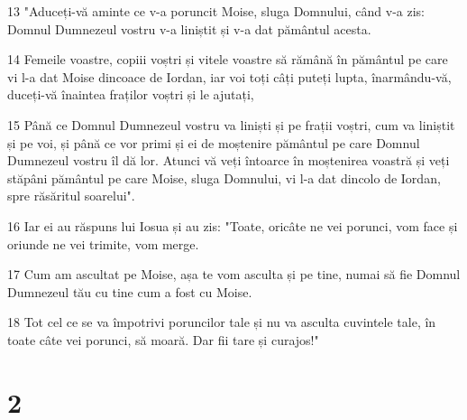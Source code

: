 \par 13 "Aduceți-vă aminte ce v-a poruncit Moise, sluga Domnului, când v-a zis: Domnul Dumnezeul vostru v-a liniștit și v-a dat pământul acesta.
\par 14 Femeile voastre, copiii voștri și vitele voastre să rămână în pământul pe care vi l-a dat Moise dincoace de Iordan, iar voi toți câți puteți lupta, înarmându-vă, duceți-vă înaintea fraților voștri și le ajutați,
\par 15 Până ce Domnul Dumnezeul vostru va liniști și pe frații voștri, cum va liniștit și pe voi, și până ce vor primi și ei de moștenire pământul pe care Domnul Dumnezeul vostru îl dă lor. Atunci vă veți întoarce în moștenirea voastră și veți stăpâni pământul pe care Moise, sluga Domnului, vi l-a dat dincolo de Iordan, spre răsăritul soarelui".
\par 16 Iar ei au răspuns lui Iosua și au zis: "Toate, oricâte ne vei porunci, vom face și oriunde ne vei trimite, vom merge.
\par 17 Cum am ascultat pe Moise, așa te vom asculta și pe tine, numai să fie Domnul Dumnezeul tău cu tine cum a fost cu Moise.
\par 18 Tot cel ce se va împotrivi poruncilor tale și nu va asculta cuvintele tale, în toate câte vei porunci, să moară. Dar fii tare și curajos!"

\chapter{2}

